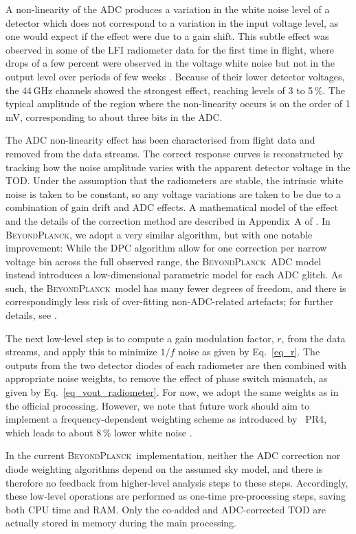 \documentclass[onecolumn]{aa}
\newcommand{\BP}{\textsc{BeyondPlanck}}
\begin{document}
A non-linearity of the ADC produces a variation in the white noise
level of a detector which does not correspond to a variation in the
input voltage level, as one would expect if the effect were due to a
gain shift.  This subtle effect was observed in some of the LFI
radiometer data for the first time in flight, where drops of a few
percent were observed in the voltage white noise but not in the output
level over periods of few weeks \citep{planck2013-p02a}.  Because of
their lower detector voltages, the 44\,GHz channels showed the
strongest effect, reaching levels of 3 to 5\,\%.  The typical
amplitude of the region where the non-linearity occurs is on the order
of 1\,mV, corresponding to about three bits in the ADC.

The ADC non-linearity effect has been characterised from flight data
and removed from the data streams.  The correct response curves is
reconstructed by tracking how the noise amplitude varies with the
apparent detector voltage in the TOD.  Under the assumption that the
radiometers are stable, the intrinsic white noise is taken to be
constant, so any voltage variations are taken to be due to a
combination of gain drift and ADC effects.  A mathematical model of
the effect and the details of the correction method are described in
Appendix~A of \citet{planck2013-p02a}. In \BP, we adopt a very similar
algorithm, but with one notable improvement: While the DPC algorithm
allow for one correction per narrow voltage bin across the full
observed range, the \BP\ ADC model instead introduces a
low-dimensional parametric model for each ADC glitch. As such, the
\BP\ model has many fewer degrees of freedom, and there is
correspondingly less risk of over-fitting non-ADC-related artefacts;
for further details, see \citet{bp25}.

The next low-level step is to compute a gain modulation factor, $r$,
from the data streams, and apply this to minimize $1/f$ noise as given
by Eq.~\eqref{eq_r}. The outputs from the two detector diodes of each
radiometer are then combined with appropriate noise weights, to remove
the effect of phase switch mismatch, as given by
Eq.~\eqref{eq_vout_radiometer}. For now, we adopt the same weights as
in the official processing. However, we note that future work should
aim to implement a frequency-dependent weighting scheme as introduced
by \Planck\ PR4, which leads to about 8\,\% lower white noise
\citep{npipe}.

In the current \BP\ implementation, neither the ADC correction nor
diode weighting algorithms depend on the assumed sky model, and there
is therefore no feedback from higher-level analysis steps to these
steps. Accordingly, these low-level operations are performed as
one-time pre-processing steps, saving both CPU time and RAM. Only the
co-added and ADC-corrected TOD are actually stored in memory during
the main processing.
\end{document}
